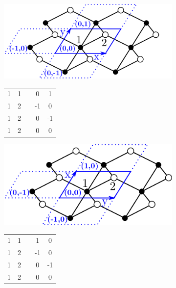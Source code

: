 \documentclass[main.tex]{subfiles}
\begin{document}
\begin{figure}[t]
	\begin{subfigure}[b]{0.35\linewidth}
		\hspace{-1.5em}\includegraphics[width=0.96\linewidth]{figures/topology/cells_ref.pdf}
		
		\centering\begin{tabular}{ccccc}
			1&1&&0&1\\
			1&2&&-1&0\\
			1&2&&0&-1\\
			1&2&&0&0
		\end{tabular}
		
	\end{subfigure}%
	\begin{subfigure}[b]{0.35\linewidth}
		\hspace{-1.5em}\includegraphics[width=0.9\linewidth]{figures/topology/cells_xy.pdf}
		
		\centering\begin{tabular}{ccccc}
			1&1&&1&0\\
			1&2&&-1&0\\
			1&2&&0&-1\\
			1&2&&0&0
		\end{tabular}
		

\end{subfigure}
\end{figure}
\end{document}
